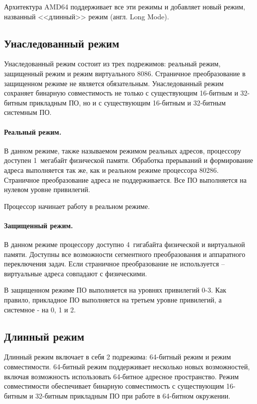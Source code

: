Архитектура AMD64 поддерживает все эти режимы и добавляет новый режим,
названный <<длинный>> режим (англ. Long Mode).


\subsection{Унаследованный режим}
Унаследованный режим состоит из трех подрежимов: реальный режим, защищенный режим и режим виртуального 8086.
Страничное преобразование в защищенном режиме не является обязательным. Унаследованный режим сохраняет
бинарную совместимость не только с существующим 16-битным и 32-битным прикладным ПО, но и с существующим
16-битным и 32-битным системным ПО.

\paragraph{Реальный режим.}
В данном режиме, также называемом режимом реальных адресов, процессору доступен 1~мегабайт физической памяти.
Обработка прерываний и формирование адреса выполняется так же, как и реальном режиме процессора 80286.
Страничное преобразование адреса не поддерживается. Все ПО выполняется на нулевом уровне привилегий.

Процессор начинает работу в реальном режиме.

\paragraph{Защищенный режим.}
В данном режиме процессору доступно 4~гигабайта физической и виртуальной памяти. Доступны все возможности
сегментного преобразования и аппаратного переключения задач. Если страничное преобразование не используется --
виртуальные адреса совпадают с физическими.

В защищенном режиме ПО выполняется на уровнях привилегий 0-3. Как правило, прикладное ПО выполняется на третьем
уровне привилегий, а системное - на 0, 1 и 2.


\subsection{Длинный режим}
Длинный режим включает в себя 2 подрежима: 64-битный режим и режим совместимости.
64-битный режим поддерживает несколько новых возможностей, включая возможность
использовать 64-битное адресное пространство. Режим совместимости обеспечивает
бинарную совместимость с существующим 16-битным и 32-битным прикладным ПО при работе
в 64-битном окружении.

